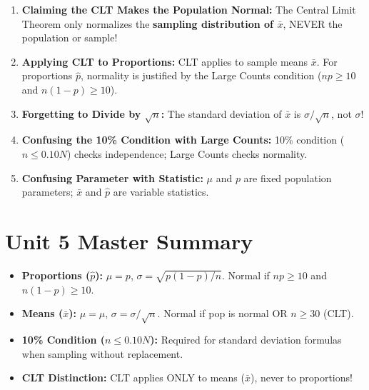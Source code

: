 \begin{trapbox}
\begin{enumerate}[leftmargin=1.2em]
  \item \textbf{Claiming the CLT Makes the Population Normal:} The Central Limit Theorem only normalizes the \textbf{sampling distribution of $\bar{x}$}, NEVER the population or sample!
  \item \textbf{Applying CLT to Proportions:} CLT applies to sample means $\bar{x}$. For proportions $\hat{p}$, normality is justified by the Large Counts condition ($np \ge 10$ and $n(1-p) \ge 10$).
  \item \textbf{Forgetting to Divide by $\sqrt{n}$:} The standard deviation of $\bar{x}$ is $\sigma / \sqrt{n}$, not $\sigma$!
  \item \textbf{Confusing the 10\% Condition with Large Counts:} 10\% condition ($n \le 0.10N$) checks independence; Large Counts checks normality.
  \item \textbf{Confusing Parameter with Statistic:} $\mu$ and $p$ are fixed population parameters; $\bar{x}$ and $\hat{p}$ are variable statistics.
\end{enumerate}
\end{trapbox}
\section{Unit 5 Master Summary}
\begin{lessonbox}
\begin{itemize}[leftmargin=1.2em]
  \item \textbf{Proportions ($\hat{p}$):} $\mu = p$, $\sigma = \sqrt{p(1-p)/n}$. Normal if $np \ge 10$ and $n(1-p) \ge 10$.
  \item \textbf{Means ($\bar{x}$):} $\mu = \mu$, $\sigma = \sigma/\sqrt{n}$. Normal if pop is normal OR $n \ge 30$ (CLT).
  \item \textbf{10\% Condition ($n \le 0.10N$):} Required for standard deviation formulas when sampling without replacement.
  \item \textbf{CLT Distinction:} CLT applies ONLY to means ($\bar{x}$), never to proportions!
\end{itemize}
\end{lessonbox}
\clearpage
